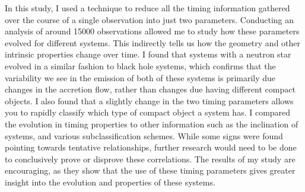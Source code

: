 In this study, I used a technique to reduce all the timing information gathered over the course of a single observation into just two parameters. Conducting an analysis of around 15000 observations allowed me to study how these parameters evolved for different systems. This indirectly tells us how the geometry and other intrinsic properties change over time. I found that systems with a neutron star evolved in a similar fashion to black hole systems, which confirms that the variability we see in the emission of both of these systems is primarily due changes in the accretion flow, rather than changes due having different compact objects.  I also found that a slightly change in the two timing parameters allows you to rapidly classify which type of compact object a system has. I compared the evolution in timing properties to other information such as the inclination of systems, and various subclassification schemes. While some signs were found pointing towards tentative relationships, further research would need to be done to conclusively prove or disprove these correlations. The results of my study are encouraging, as they show that the use of these timing parameters gives greater insight into the evolution and properties of these systems.


\endgroup